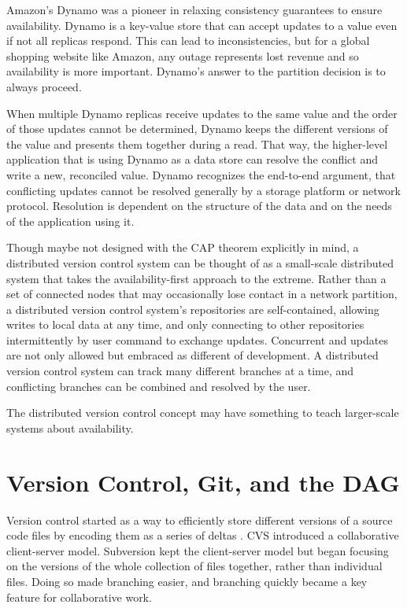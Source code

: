 Amazon's Dynamo\cite{dynamo} was a pioneer in relaxing consistency guarantees to
ensure availability. Dynamo is a key-value store that can accept updates to a
value even if not all replicas respond. This can lead to inconsistencies, but
for a global shopping website like Amazon, any outage represents lost revenue
and so availability is more important. Dynamo's answer to the partition decision
is to always proceed.

When multiple Dynamo replicas receive updates to the same value and the order of
those updates cannot be determined, Dynamo keeps the different versions of the
value and presents them together during a read. That way, the higher-level
application that is using Dynamo as a data store can resolve the conflict and
write a new, reconciled value. Dynamo recognizes the end-to-end
argument\cite{endtoendargument}, that conflicting updates cannot be resolved
generally by a storage platform or network protocol. Resolution is dependent on
the structure of the data and on the needs of the application using it.

Though maybe not designed with the CAP theorem explicitly in mind, a distributed
version control system can be thought of as a small-scale distributed system
that takes the availability-first approach to the extreme. Rather than a set of
connected nodes that may occasionally lose contact in a network partition, a
distributed version control system's repositories are self-contained, allowing
writes to local data at any time, and only connecting to other repositories
intermittently by user command to exchange updates. Concurrent and updates are
not only allowed but embraced as different  of development. A
distributed version control system can track many different branches at a time,
and conflicting branches can be combined and resolved by the user.

The distributed version control concept may have something to teach larger-scale
systems about availability.

%



\section{Version Control, Git, and the DAG}

Version control started as a way to efficiently store different versions of a
source code files by encoding them as a series of deltas
\cite{history_of_version_control}. CVS introduced a collaborative client-server
model. Subversion kept the client-server model but began focusing on the
versions of the whole collection of files together, rather than individual
files. Doing so made branching easier, and branching quickly became a key
feature for collaborative work.

